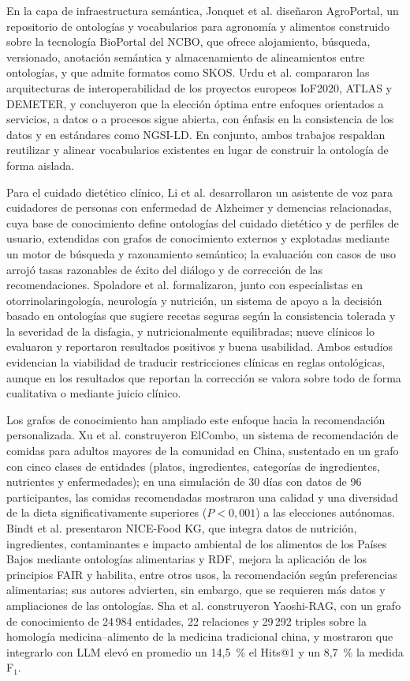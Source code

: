\documentclass[conference]{IEEEtran}
\begin{document}
En la capa de infraestructura semántica, Jonquet et al. \cite{jonquet2018} diseñaron AgroPortal, un repositorio de ontologías y vocabularios para agronomía y alimentos construido sobre la tecnología BioPortal del NCBO, que ofrece alojamiento, búsqueda, versionado, anotación semántica y almacenamiento de alineamientos entre ontologías, y que admite formatos como SKOS. Urdu et al. \cite{urdu2024} compararon las arquitecturas de interoperabilidad de los proyectos europeos IoF2020, ATLAS y DEMETER, y concluyeron que la elección óptima entre enfoques orientados a servicios, a datos o a procesos sigue abierta, con énfasis en la consistencia de los datos y en estándares como NGSI-LD. En conjunto, ambos trabajos respaldan reutilizar y alinear vocabularios existentes en lugar de construir la ontología de forma aislada.

Para el cuidado dietético clínico, Li et al. \cite{li2020} desarrollaron un asistente de voz para cuidadores de personas con enfermedad de Alzheimer y demencias relacionadas, cuya base de conocimiento define ontologías del cuidado dietético y de perfiles de usuario, extendidas con grafos de conocimiento externos y explotadas mediante un motor de búsqueda y razonamiento semántico; la evaluación con casos de uso arrojó tasas razonables de éxito del diálogo y de corrección de las recomendaciones. Spoladore et al. \cite{spoladore2024} formalizaron, junto con especialistas en otorrinolaringología, neurología y nutrición, un sistema de apoyo a la decisión basado en ontologías que sugiere recetas seguras según la consistencia tolerada y la severidad de la disfagia, y nutricionalmente equilibradas; nueve clínicos lo evaluaron y reportaron resultados positivos y buena usabilidad. Ambos estudios evidencian la viabilidad de traducir restricciones clínicas en reglas ontológicas, aunque en los resultados que reportan la corrección se valora sobre todo de forma cualitativa o mediante juicio clínico.

Los grafos de conocimiento han ampliado este enfoque hacia la recomendación personalizada. Xu et al. \cite{xu2024} construyeron ElCombo, un sistema de recomendación de comidas para adultos mayores de la comunidad en China, sustentado en un grafo con cinco clases de entidades (platos, ingredientes, categorías de ingredientes, nutrientes y enfermedades); en una simulación de 30 días con datos de 96 participantes, las comidas recomendadas mostraron una calidad y una diversidad de la dieta significativamente superiores ($P<0{,}001$) a las elecciones autónomas. Bindt et al. \cite{bindt2026} presentaron NICE-Food KG, que integra datos de nutrición, ingredientes, contaminantes e impacto ambiental de los alimentos de los Países Bajos mediante ontologías alimentarias y RDF, mejora la aplicación de los principios FAIR y habilita, entre otros usos, la recomendación según preferencias alimentarias; sus autores advierten, sin embargo, que se requieren más datos y ampliaciones de las ontologías. Sha et al. \cite{sha2025} construyeron Yaoshi-RAG, con un grafo de conocimiento de 24\,984 entidades, 22 relaciones y 29\,292 triples sobre la homología medicina--alimento de la medicina tradicional china, y mostraron que integrarlo con LLM elevó en promedio un 14,5~\% el Hits@1 y un 8,7~\% la medida F$_1$.
\end{document}
